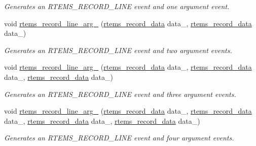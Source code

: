 \begin{DoxyCompactItemize}
\begin{DoxyCompactList}\small\item\em Generates an R\+T\+E\+M\+S\+\_\+\+R\+E\+C\+O\+R\+D\+\_\+\+L\+I\+NE event and one argument event. \end{DoxyCompactList}\item 
void \mbox{\hyperlink{group__RTEMSRecord_ga547a6428c652cba5db755855c67d55b2}{rtems\+\_\+record\+\_\+line\+\_\+arg\+\_}} (\mbox{\hyperlink{group__RTEMSRecord_gab483bd3ec735835dac6788b78c817eab}{rtems\+\_\+record\+\_\+data}} data\+\_, \mbox{\hyperlink{group__RTEMSRecord_gab483bd3ec735835dac6788b78c817eab}{rtems\+\_\+record\+\_\+data}} data\+\_)
\begin{DoxyCompactList}\small\item\em Generates an R\+T\+E\+M\+S\+\_\+\+R\+E\+C\+O\+R\+D\+\_\+\+L\+I\+NE event and two argument events. \end{DoxyCompactList}\item 
void \mbox{\hyperlink{group__RTEMSRecord_gaa8e8420d7d8e1dce17ff689cd1efd1ff}{rtems\+\_\+record\+\_\+line\+\_\+arg\+\_}} (\mbox{\hyperlink{group__RTEMSRecord_gab483bd3ec735835dac6788b78c817eab}{rtems\+\_\+record\+\_\+data}} data\+\_, \mbox{\hyperlink{group__RTEMSRecord_gab483bd3ec735835dac6788b78c817eab}{rtems\+\_\+record\+\_\+data}} data\+\_, \mbox{\hyperlink{group__RTEMSRecord_gab483bd3ec735835dac6788b78c817eab}{rtems\+\_\+record\+\_\+data}} data\+\_)
\begin{DoxyCompactList}\small\item\em Generates an R\+T\+E\+M\+S\+\_\+\+R\+E\+C\+O\+R\+D\+\_\+\+L\+I\+NE event and three argument events. \end{DoxyCompactList}\item 
void \mbox{\hyperlink{group__RTEMSRecord_ga440769c3469c94bf59efc3cc2f977493}{rtems\+\_\+record\+\_\+line\+\_\+arg\+\_}} (\mbox{\hyperlink{group__RTEMSRecord_gab483bd3ec735835dac6788b78c817eab}{rtems\+\_\+record\+\_\+data}} data\+\_, \mbox{\hyperlink{group__RTEMSRecord_gab483bd3ec735835dac6788b78c817eab}{rtems\+\_\+record\+\_\+data}} data\+\_, \mbox{\hyperlink{group__RTEMSRecord_gab483bd3ec735835dac6788b78c817eab}{rtems\+\_\+record\+\_\+data}} data\+\_, \mbox{\hyperlink{group__RTEMSRecord_gab483bd3ec735835dac6788b78c817eab}{rtems\+\_\+record\+\_\+data}} data\+\_)
\begin{DoxyCompactList}\small\item\em Generates an R\+T\+E\+M\+S\+\_\+\+R\+E\+C\+O\+R\+D\+\_\+\+L\+I\+NE event and four argument events. \end{DoxyCompactList}\item 

\end{DoxyCompactItemize}

